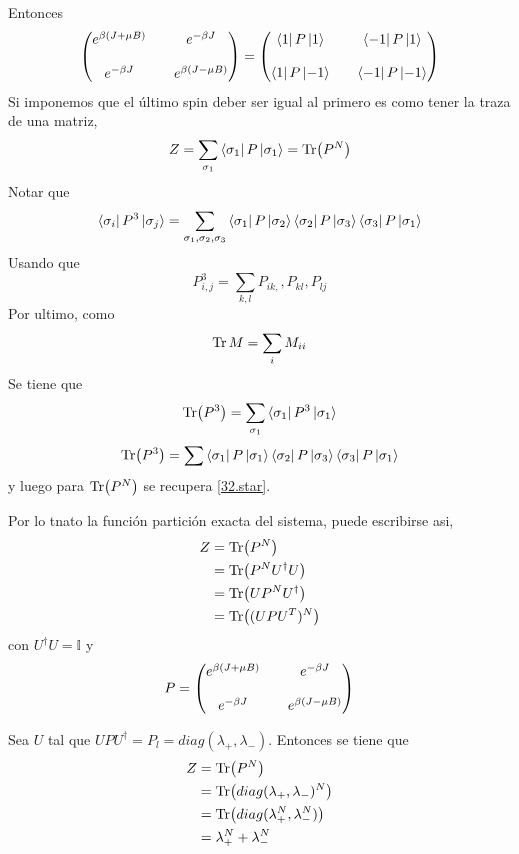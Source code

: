 Entonces 
\begin{equation}
  \mqty(e^{\b(J+\m B)}&&e^{-\b J}\\\\
  e^{-\b J}&& e^{\b (J-\m B)})=\mqty(\bra{1}P\ket{1}&&\bra{-1}P\ket{1}\\\\
  \bra{1}P\ket{-1}&& \bra{-1}P\ket{-1})
\end{equation}
Si imponemos que el último spin deber ser igual al primero es como tener la traza de una matriz,
\begin{equation}
  Z=\sum_{\sigma_1}\bra{\sigma_1}P\ket{\sigma_1}=\Tr (P^N)
\end{equation}
Notar que
\begin{equation}
  \bra{\sigma_i}P^3\ket{\sigma_j}=\sum_{\sigma_1,\sigma_2,\sigma_3}\bra{\sigma_1}P\ket{\sigma_2}\bra{\sigma_2}P\ket{\sigma_3}\bra{\sigma_3}P\ket{\sigma_1}
\end{equation}
Usando que
\begin{equation}
  P^3_{i,j}=\sum_{k,l}P_{ik,},P_{kl},P_{lj}
\end{equation}
Por ultimo, como
\begin{equation}
  \Tr M=\sum_i M_{ii}
\end{equation}
Se tiene que
\begin{equation}
  \Tr (P^3)=\sum_{\sigma_1}\bra{\sigma_1}P^3\ket{\sigma_1}
\end{equation}
\begin{equation}
  \Tr(P^3)=\sum \bra{\sigma_1}P\ket{\sigma_1}\bra{\sigma_2}P\ket{\sigma_3}\bra{\sigma_3}P\ket{\sigma_1}
\end{equation}
y luego para $\Tr(P^N)$ se recupera \eqref{32.star}.

Por lo tnato la función partición exacta del sistema, puede escribirse asi,
\begin{align}
  Z&=\Tr(P^N)\\
  &=\Tr(P^NU^\dagger U)\\
  &=\Tr(UP^NU^\dagger)\\
  &=\Tr((UPU^T)^N)
\end{align}
con $U^\dagger U=\mathbb{I}$ y 
\begin{equation}
  P= \mqty(e^{\b(J+\m B)}&&e^{-\b J}\\\\
  e^{-\b J}&& e^{\b (J-\m B)})
\end{equation}

Sea $U$ tal que $UPU^\dagger=P_l=diag(\lambda_+,\lambda_-)$. Entonces se tiene que
\begin{align}
  Z&=\Tr(P^N)\\
  &=\Tr(diag(\lambda_+,\lambda_-)^N)\\
  &=\Tr(diag(\lambda_+^N,\lambda_-^N))\\
  &=\lambda_+^N+\lambda_-^N
\end{align}

